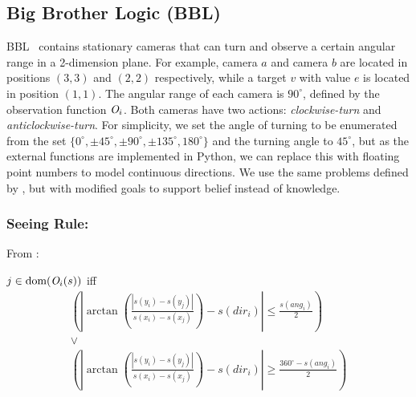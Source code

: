 



\subsection{Big Brother Logic (BBL)}
BBL~\cite{DBLP:conf/atal/GasquetGS14} contains stationary cameras that can turn and observe a certain angular range in a 2-dimension plane.
For example,  camera $a$ and camera $b$ are located in positions $(3,3)$ and $(2,2)$ respectively, while a target $v$ with value $e$ is located in position $(1,1)$.
The angular range of each camera is $90^\circ$, defined by the observation function $\mathit{O}_i$.
Both cameras have two actions: \emph{clockwise-turn} and \emph{anticlockwise-turn}.
For simplicity, we set the angle of turning to be enumerated from the set $\{0^\circ,\pm 45^\circ, \pm 90^\circ, \pm135^\circ, 180^\circ\}$ 
and the turning angle to $45^\circ$, but as the external functions are implemented in Python, we can replace this with floating point numbers to  model continuous directions. We use the same problems defined by \citet{Hu2022-ul}, but with modified goals to support belief instead of knowledge.

\subsubsection{Seeing Rule:} From \citet{Hu2022-ul}:

$ j \in \textrm{dom}(\mathit{O}_i(s))$ iff
\begin{equation}
    \label{eq:bbl}
    \begin{array}{c}
    \left(|\arctan (\frac{|s(y_i)-s(y_j)|}{s(x_i)-s(x_j)}) - s(dir_i)| \leq \frac{s(ang_i)}{2}\right)\\ 
    \lor \\ 
    \left(|\arctan (\frac{|s(y_i)-s(y_j)|}{s(x_i)-s(x_j)}) - s(dir_i)| \geq \frac{360^\circ-s(ang_i)}{2}\right)
    \end{array}
\end{equation}


